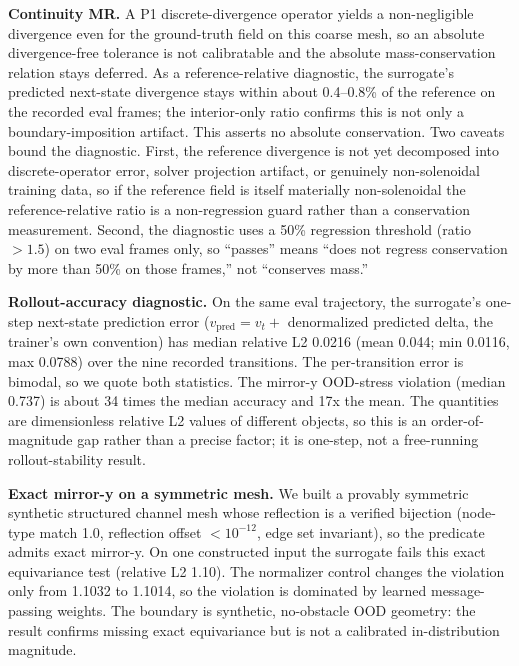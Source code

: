 \documentclass[preprint,12pt]{elsarticle}
\begin{document}
\textbf{Continuity MR.} A P1 discrete-divergence operator yields a non-negligible divergence even for the ground-truth field on this coarse mesh, so an absolute divergence-free tolerance is not calibratable and the absolute mass-conservation relation stays deferred. As a reference-relative diagnostic, the surrogate's predicted next-state divergence stays within about 0.4--0.8\% of the reference on the recorded eval frames; the interior-only ratio confirms this is not only a boundary-imposition artifact. This asserts no absolute conservation. Two caveats bound the diagnostic. First, the reference divergence is not yet decomposed into discrete-operator error, solver projection artifact, or genuinely non-solenoidal training data, so if the reference field is itself materially non-solenoidal the reference-relative ratio is a non-regression guard rather than a conservation measurement. Second, the diagnostic uses a 50\% regression threshold (ratio $>1.5$) on two eval frames only, so ``passes'' means ``does not regress conservation by more than 50\% on those frames,'' not ``conserves mass.''

\textbf{Rollout-accuracy diagnostic.} On the same eval trajectory, the surrogate's one-step next-state prediction error ($v_\mathrm{pred}=v_t+$ denormalized predicted delta, the trainer's own convention) has median relative L2 0.0216 (mean 0.044; min 0.0116, max 0.0788) over the nine recorded transitions. The per-transition error is bimodal, so we quote both statistics. The mirror-y OOD-stress violation (median 0.737) is about 34 times the median accuracy and 17x the mean. The quantities are dimensionless relative L2 values of different objects, so this is an order-of-magnitude gap rather than a precise factor; it is one-step, not a free-running rollout-stability result.

\textbf{Exact mirror-y on a symmetric mesh.} We built a provably symmetric synthetic structured channel mesh whose reflection is a verified bijection (node-type match 1.0, reflection offset $<10^{-12}$, edge set invariant), so the predicate admits exact mirror-y. On one constructed input the surrogate fails this exact equivariance test (relative L2 1.10). The normalizer control changes the violation only from 1.1032 to 1.1014, so the violation is dominated by learned message-passing weights. The boundary is synthetic, no-obstacle OOD geometry: the result confirms missing exact equivariance but is not a calibrated in-distribution magnitude.
\end{document}
